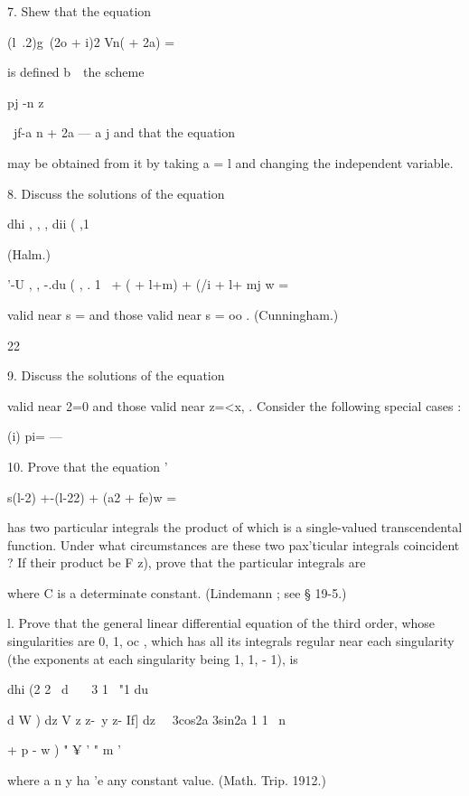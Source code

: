 7. Shew that the equation



(l\ .2)g\ (2o + i)2 Vn( + 2a) =



is defined b\ \ the scheme

pj -n z

\ jf-a n + 2a — a j and that the equation

may be obtained from it by taking a = l and changing the independent
variable.

8. Discuss the solutions of the equation

dhi , , , dii ( ,1



(Halm.)



'-U , , -.du ( , . 1 \ + ( + l+m) + (/i + l+ mj w =

valid near s = and those valid near s = oo . (Cunningham.)



 22



9. Discuss the solutions of the equation

valid near 2=0 and those valid near z=<x, . Consider the following
special cases :

(i) pi= —%

10. Prove that the equation '

s(l-2) +-(l-22) + (a2 + fe)w =

has two particular integrals the product of which is a single-valued
transcendental function. Under what circumstances are these two
pax'ticular integrals coincident ? If their product be F z), prove
that the particular integrals are

where C is a determinate constant. (Lindemann ; see § 19-5.)

l. Prove that the general linear differential equation of the third
order, whose singularities are 0, 1, oc , which has all its integrals
regular near each singularity (the exponents at each singularity being
1, 1, - 1), is

dhi (2 2 \ d \ \ \ 3 1 \ "1 du

d W ) dz V z z-\ y z- If] dz \ \ 3cos2a 3sin2a 1 1 \ n

+ p - w ) " ¥ ' " m '

where a n y ha 'e any constant value. (Math. Trip. 1912.)

